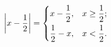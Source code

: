 \[ \left\lvert x - \frac12 \right\rvert
= \begin{dcases}
x-\frac12,  & x \geq \frac12;\\
\frac12-x,  & x < \frac12.
\end{dcases}  \]

